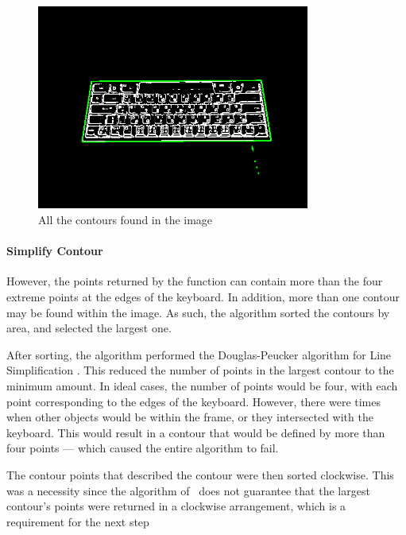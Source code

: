 \documentclass{report}
\begin{document}
\begin{figure}[H]
	\centering
	\includegraphics[width=0.8\textwidth]{find-contours.png}
	\caption{All the contours found in the image}
	\centering
\end{figure}

\paragraph{Simplify Contour}
However, the points returned by the function can contain more than the four
extreme points at the edges of the keyboard. In addition, more than one contour
may be found within the image. As such, the algorithm sorted the contours by
area, and selected the largest one.

After sorting, the algorithm performed the Douglas-Peucker algorithm for Line
Simplification \parencite{douglas-peucker}. This reduced the number of points in
the largest contour to the minimum amount. In ideal cases, the number of points
would be four, with each point corresponding to the edges of the keyboard.
However, there were times when other objects would be within the frame, or they
intersected with the keyboard. This would result in a contour that would be
defined by more than four points --- which caused the entire algorithm to fail.

The contour points that described the contour were then sorted clockwise. This
was a necessity since the algorithm of~\cite{contours} does not guarantee that
the largest contour's points were returned in a clockwise arrangement, which is
a requirement for the next step
\end{document}
